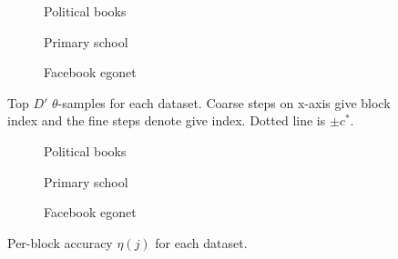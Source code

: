 \begin{figure}[!ht]
	\centering
	\begin{subfigure}{0.32\linewidth}
			\centering
			\caption{Political books}
			\label{fig:polbooks-null}
		\end{subfigure}
	\begin{subfigure}{0.32\linewidth}
			\centering
			\caption{Primary school}
			\label{fig:school-null}
		\end{subfigure}
	\begin{subfigure}{0.32\linewidth}
			\centering
			\caption{Facebook egonet}
			\label{fig:fb-null}
		\end{subfigure}
	\caption{Top $D'$ $\theta$-samples for each dataset. Coarse steps on x-axis give block index and the fine steps denote give index. Dotted line is $\pm c^*$.}
\end{figure}
%
\begin{figure}[!ht]
	\centering
	\begin{subfigure}{0.32\linewidth}
			\centering
			\caption{Political books}
			\label{fig:polbooks-accuracy}
		\end{subfigure}
	\begin{subfigure}{0.32\linewidth}
			\centering
			\caption{Primary school}
			\label{fig:school-accuracy}
		\end{subfigure}
	\begin{subfigure}{0.32\linewidth}
			\centering
			\caption{Facebook egonet}
			\label{fig:fb-accuracy}
		\end{subfigure}
	\caption{Per-block accuracy $\eta(j)$ for each dataset.}
\end{figure}